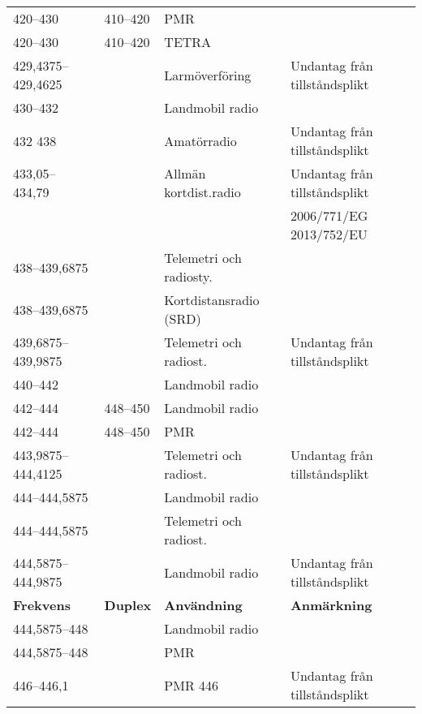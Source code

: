 \begin{landscape}
\begin{longtable}{llll}
	420--430           & 410--420           & PMR                     &  \\
	420--430           & 410--420           & TETRA                   &  \\
	429,4375--429,4625 &                    & Larmöverföring          & Undantag från tillståndsplikt            \\
	430--432           &                    & Landmobil radio         &  \\
	432	438            &                    & Amatörradio             & Undantag från tillståndsplikt            \\
	433,05--434,79     &                    & Allmän kortdist.radio   & Undantag från tillståndsplikt            \\
	                   &                    &                         & 2006/771/EG 2013/752/EU                  \\
	438--439,6875      &                    & Telemetri och radiosty. &  \\
	438--439,6875      &                    & Kortdistansradio (SRD)  &  \\
	439,6875--439,9875 &                    & Telemetri och radiost.  & Undantag från tillståndsplikt            \\
	440--442           &                    & Landmobil radio         &  \\
	442--444           & 448--450           & Landmobil radio         &  \\
	442--444           & 448--450           & PMR                     &  \\
	443,9875--444,4125 &                    & Telemetri och radiost.  & Undantag från tillståndsplikt            \\
	444--444,5875      &                    & Landmobil radio         &  \\
	444--444,5875      &                    & Telemetri och radiost.  &  \\
	444,5875--444,9875 &                    & Landmobil radio         & Undantag från tillståndsplikt            \\
	\textbf{Frekvens}  & \textbf{Duplex}    & \textbf{Användning}     & \textbf{Anmärkning}                      \\ \hline
	444,5875--448      &                    & Landmobil radio         &  \\
	444,5875--448      &                    & PMR                     &  \\
	446--446,1         &                    & PMR 446                 & Undantag från tillståndsplikt            \\

\end{longtable}
\end{landscape}
